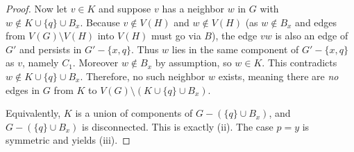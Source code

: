 \documentclass[12pt]{article}
\begin{document}
\begin{proof}
Now let $v\in K$ and suppose $v$ has a neighbor $w$ in $G$ with
$w\notin K\cup\{q\}\cup B_x$.
Because $v\notin V(H)$ and $w\notin V(H)$ (as $w\notin B_x$ and edges from $V(G)\setminus V(H)$ into $V(H)$
must go via $B$), the edge $vw$ is also an edge of $G'$ and persists in $G'-\{x,q\}$.
Thus $w$ lies in the same component of $G'-\{x,q\}$ as $v$, namely $C_1$.
Moreover $w\notin B_x$ by assumption, so $w\in K$.
This contradicts $w\notin K\cup\{q\}\cup B_x$.
Therefore, no such neighbor $w$ exists, meaning there are \emph{no} edges in $G$ from $K$ to
$V(G)\setminus (K\cup\{q\}\cup B_x)$.

Equivalently, $K$ is a union of components of $G-(\{q\}\cup B_x)$, and $G-(\{q\}\cup B_x)$ is disconnected.
This is exactly (ii). The case $p=y$ is symmetric and yields (iii).
\end{proof}
\end{document}
